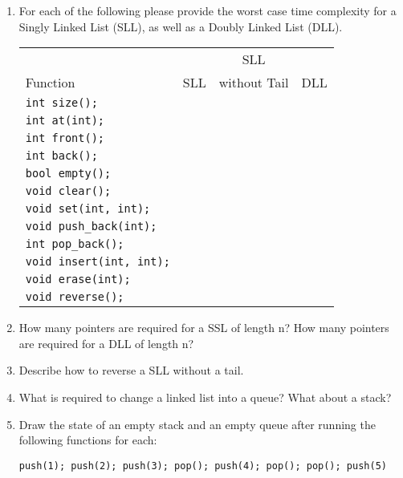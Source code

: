 \documentclass[11pt]{article}
\begin{document}
    \begin{enumerate}
        \item For each of the following please provide the worst case time complexity for a Singly Linked List (SLL), as well as a Doubly Linked List (DLL). 
    
    \begin{tabular}{l | c | c | c}
                 &     & SLL          &  \\ 
        Function & SLL & without Tail & DLL \\ \hline
        \verb|int size();| & & & \\ \hline
        \verb|int at(int);| & & & \\ \hline
        \verb|int front();| & & & \\ \hline
        \verb|int back();| & & & \\ \hline
        \verb|bool empty();| & & & \\ \hline
        \verb|void clear();| & & & \\ \hline
        \verb|void set(int, int);| & & & \\ \hline
        \verb|void push_back(int);| & & & \\ \hline
        \verb|int pop_back();| & & & \\ \hline
        \verb|void insert(int, int);| & & & \\ \hline
        \verb|void erase(int);| & & & \\ \hline
        \verb|void reverse();| & & & \\ \hline
    \end{tabular}
    
        \item How many pointers are required for a SSL of length n? How many pointers are required for a DLL of length n?
        
        \item Describe how to reverse a SLL without a tail.
        
        \item What is required to change a linked list into a queue? What about a stack?
        
        \item Draw the state of an empty stack and an empty queue after running the following functions for each:
\begin{verbatim}
push(1); push(2); push(3); pop(); push(4); pop(); pop(); push(5)
\end{verbatim}
    \end{enumerate}
    \label{r:lastpage}
    
\end{document}
